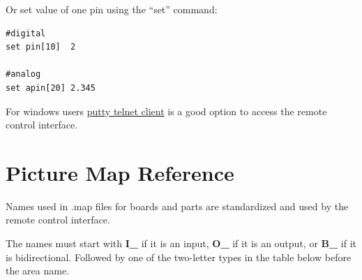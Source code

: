 Or set value of one pin using the ``set'' command:
\begin{verbatim}
#digital
set pin[10]  2

#analog
set apin[20] 2.345
\end{verbatim}



For windows users \href{https://www.putty.org/}{putty telnet client} is a good option 
to access the remote control interface. 


\section{Picture Map Reference}\hypertarget{def:map}{}

Names used in .map files for boards and parts are standardized and used by the remote control interface. 

The names must start with \textbf{I\_} if it is an input, \textbf{O\_} if it is an output, or \textbf{B\_} if it
is bidirectional. 
Followed by one of the two-letter types in the table below before the area name. 

